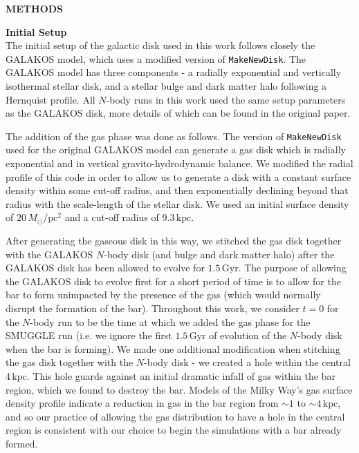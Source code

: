 \documentclass{natureprintstyle}
\newcommand{\Nbody}{$N$-body}
\begin{document}
\noindent
{\bf \Large \uppercase{Methods} }

\bigskip

\noindent
{\bf Initial Setup}
\\
\noindent
The initial setup of the galactic disk used in this work follows closely the
GALAKOS model\cite{2020ApJ...890..117D}, which uses a modified version of
\texttt{MakeNewDisk}.\cite{2005MNRAS.361..776S} The GALAKOS model has three
components - a radially exponential and vertically isothermal stellar disk,
and a stellar bulge and dark matter halo following a Hernquist
profile.\cite{1990ApJ...356..359H} All \Nbody{} runs in this work used the same
setup parameters as the GALAKOS disk, more details of which can be found in
the original paper.

The addition of the gas phase was done as follows. The version of
\texttt{MakeNewDisk} used for the original GALAKOS model can generate a gas
disk which is radially exponential and in vertical gravito-hydrodynamic
balance. We modified the radial profile of this code in order to allow us to
generate a disk with a constant surface density within some cut-off radius,
and then exponentially declining beyond that radius with the scale-length of
the stellar disk. We used an initial surface density of
$20\,M_{\odot}/\textrm{pc}^2$ and a cut-off radius of $9.3\,\textrm{kpc}$.

After generating the gaseous disk in this way, we stitched the gas disk
together with the GALAKOS \Nbody{} disk (and bulge and dark matter halo) after
the GALAKOS disk has been allowed to evolve for $1.5\,\textrm{Gyr}$. The
purpose of allowing the GALAKOS disk to evolve first for a short period of
time is to allow for the bar to form unimpacted by the presence of the gas
(which would normally disrupt the formation of the bar). Throughout this work,
we consider $t=0$ for the \Nbody{} run to be the time at which we added the
gas phase for the SMUGGLE run (i.e. we ignore the first $1.5\,\textrm{Gyr}$ of
evolution of the \Nbody{} disk when the bar is forming). We made one
additional modification when stitching the gas disk together with the \Nbody{}
disk - we created a hole within the central $4\,\textrm{kpc}$. This hole
guards against an initial dramatic infall of gas within the bar region, which
we found to destroy the bar. Models of the Milky Way's gas surface density
profile indicate a reduction in gas in the bar region from $\sim1$ to
$\sim4\,\textrm{kpc}$,\cite{2022ApJ...929L..18E} and so our practice of
allowing the gas distribution to have a hole in the central region is
consistent with our choice to begin the simulations with a bar already formed.
\end{document}
